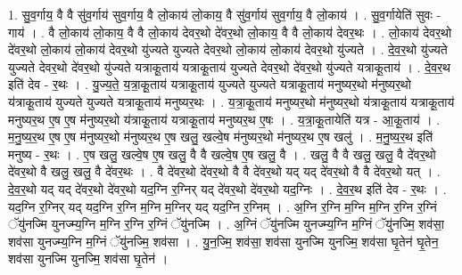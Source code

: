 \documentclass[17pt]{extarticle}
\begin{document}
1. सु॒व॒र्गाय॒ वै वै सु॑व॒र्गाय॑ सुव॒र्गाय॒ वै लो॒काय॑ लो॒काय॒ वै सु॑व॒र्गाय॑ सुव॒र्गाय॒ वै लो॒काय॑ । . सु॒व॒र्गायेति॑ सुवः - गाय॑ । . वै लो॒काय॑ लो॒काय॒ वै वै लो॒काय॑ देवर॒थो दे॑वर॒थो लो॒काय॒ वै वै लो॒काय॑ देवर॒थः । . लो॒काय॑ देवर॒थो दे॑वर॒थो लो॒काय॑ लो॒काय॑ देवर॒थो यु॑ज्यते युज्यते देवर॒थो लो॒काय॑ लो॒काय॑ देवर॒थो यु॑ज्यते । . दे॒व॒र॒थो यु॑ज्यते युज्यते देवर॒थो दे॑वर॒थो यु॑ज्यते यत्राकू॒ताय॑ यत्राकू॒ताय॑ युज्यते देवर॒थो दे॑वर॒थो यु॑ज्यते यत्राकू॒ताय॑ । . दे॒व॒र॒थ इति॑ देव - र॒थः । . यु॒ज्य॒ते॒ य॒त्रा॒कू॒ताय॑ यत्राकू॒ताय॑ युज्यते युज्यते यत्राकू॒ताय॑ मनुष्यर॒थो म॑नुष्यर॒थो य॑त्राकू॒ताय॑ युज्यते युज्यते यत्राकू॒ताय॑ मनुष्यर॒थः । . य॒त्रा॒कू॒ताय॑ मनुष्यर॒थो म॑नुष्यर॒थो य॑त्राकू॒ताय॑ यत्राकू॒ताय॑ मनुष्यर॒थ ए॒ष ए॒ष म॑नुष्यर॒थो य॑त्राकू॒ताय॑ यत्राकू॒ताय॑ मनुष्यर॒थ ए॒षः । . य॒त्रा॒कू॒तायेति॑ यत्र - आ॒कू॒ताय॑ । . म॒नु॒ष्य॒र॒थ ए॒ष ए॒ष म॑नुष्यर॒थो म॑नुष्यर॒थ ए॒ष खलु॒ खल्वे॒ष म॑नुष्यर॒थो म॑नुष्यर॒थ ए॒ष खलु॑ । . म॒नु॒ष्य॒र॒थ इति॑ मनुष्य - र॒थः । . ए॒ष खलु॒ खल्वे॒ष ए॒ष खलु॒ वै वै खल्वे॒ष ए॒ष खलु॒ वै । . खलु॒ वै वै खलु॒ खलु॒ वै दे॑वर॒थो दे॑वर॒थो वै खलु॒ खलु॒ वै दे॑वर॒थः । . वै दे॑वर॒थो दे॑वर॒थो वै वै दे॑वर॒थो यद् यद् दे॑वर॒थो वै वै दे॑वर॒थो यत् । . दे॒व॒र॒थो यद् यद् दे॑वर॒थो दे॑वर॒थो यद॒ग्नि र॒ग्निर् यद् दे॑वर॒थो दे॑वर॒थो यद॒ग्निः । . दे॒व॒र॒थ इति॑ देव - र॒थः । . यद॒ग्नि र॒ग्निर् यद् यद॒ग्नि र॒ग्नि म॒ग्नि म॒ग्निर् यद् यद॒ग्नि र॒ग्निम् । . अ॒ग्नि र॒ग्नि म॒ग्नि म॒ग्नि र॒ग्नि र॒ग्निं ॅयु॑नज्मि युनज्म्य॒ग्नि म॒ग्नि र॒ग्नि र॒ग्निं ॅयु॑नज्मि । . अ॒ग्निं ॅयु॑नज्मि युनज्म्य॒ग्नि म॒ग्निं ॅयु॑नज्मि॒ शव॑सा॒ शव॑सा युनज्म्य॒ग्नि म॒ग्निं ॅयु॑नज्मि॒ शव॑सा । . यु॒न॒ज्मि॒ शव॑सा॒ शव॑सा युनज्मि युनज्मि॒ शव॑सा घृ॒तेन॑ घृ॒तेन॒ शव॑सा युनज्मि युनज्मि॒ शव॑सा घृ॒तेन॑ । \newline
\end{document}
